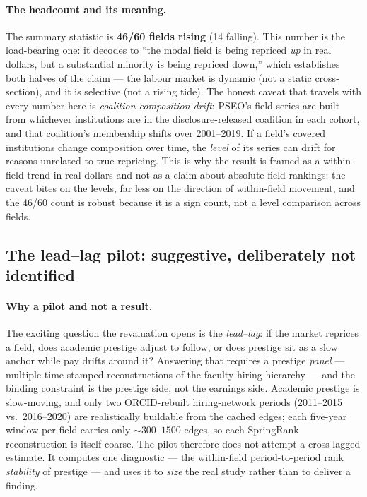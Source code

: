 \documentclass[11pt]{article}
\begin{document}
\paragraph{The headcount and its meaning.} The summary statistic is \textbf{46/60 fields rising} (14 falling). This number is the load-bearing one: it decodes to ``the modal field is being repriced \emph{up} in real dollars, but a substantial minority is being repriced down,'' which establishes both halves of the claim --- the labour market is dynamic (not a static cross-section), and it is selective (not a rising tide). The honest caveat that travels with every number here is \emph{coalition-composition drift}: PSEO's field series are built from whichever institutions are in the disclosure-released coalition in each cohort, and that coalition's membership shifts over 2001--2019. If a field's covered institutions change composition over time, the \emph{level} of its series can drift for reasons unrelated to true repricing. This is why the result is framed as a within-field trend in real dollars and not as a claim about absolute field rankings: the caveat bites on the levels, far less on the direction of within-field movement, and the 46/60 count is robust because it is a sign count, not a level comparison across fields.

\subsection{The lead--lag pilot: suggestive, deliberately not identified}\label{sec:leadlag}

\paragraph{Why a pilot and not a result.} The exciting question the revaluation opens is the \emph{lead--lag}: if the market reprices a field, does academic prestige adjust to follow, or does prestige sit as a slow anchor while pay drifts around it? Answering that requires a prestige \emph{panel} --- multiple time-stamped reconstructions of the faculty-hiring hierarchy --- and the binding constraint is the prestige side, not the earnings side. Academic prestige is slow-moving, and only two ORCID-rebuilt hiring-network periods (2011--2015 vs.\ 2016--2020) are realistically buildable from the cached edges; each five-year window per field carries only $\sim\!300$--$1500$ edges, so each SpringRank reconstruction is itself coarse. The pilot therefore does not attempt a cross-lagged estimate. It computes one diagnostic --- the within-field period-to-period rank \emph{stability} of prestige --- and uses it to \emph{size} the real study rather than to deliver a finding.
\end{document}
